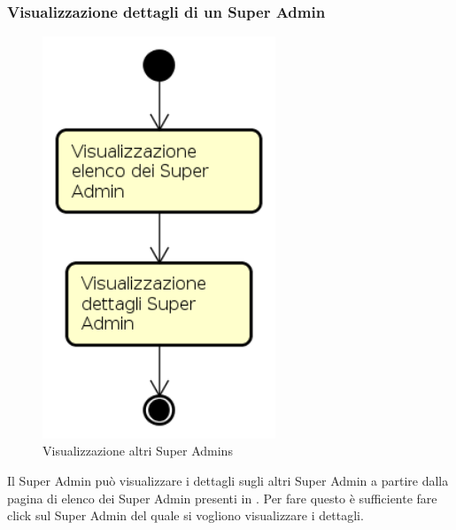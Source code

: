 \subsubsection{Visualizzazione dettagli di un Super Admin}
\begin{figure}[H]
\begin{center}
\includegraphics[height=12cm]{res/sections/backend/activities/visualizzazioneDettagliSuperAdminSA.png}
\caption{Visualizzazione altri Super Admins}
\end{center}
\end{figure}
Il Super Admin può visualizzare i dettagli sugli altri Super Admin a partire dalla pagina di elenco dei Super Admin presenti in . Per fare questo è sufficiente fare click sul Super Admin del quale si vogliono visualizzare i dettagli.